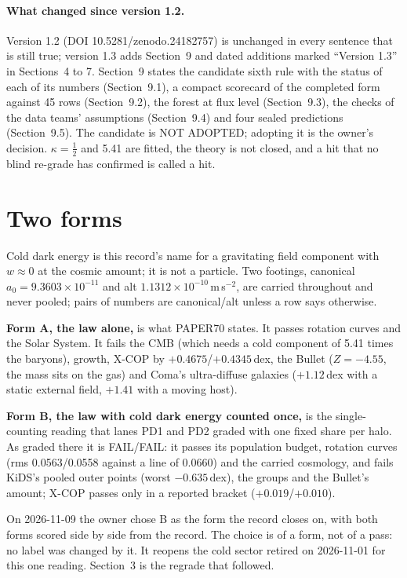 \documentclass[10pt]{article}
\begin{document}
\paragraph{What changed since version 1.2.} Version 1.2 (DOI 10.5281/zenodo.24182757) is unchanged in every sentence that is still true; version 1.3 adds Section~9 and dated additions marked ``Version 1.3'' in Sections~4 to 7. Section~9 states the candidate sixth rule with the status of each of its numbers (Section~9.1), a compact scorecard of the completed form against 45 rows (Section~9.2), the forest at flux level (Section~9.3), the checks of the data teams' assumptions (Section~9.4) and four sealed predictions (Section~9.5). The candidate is NOT ADOPTED; adopting it is the owner's decision. $\kappa=\tfrac12$ and 5.41 are fitted, the theory is not closed, and a hit that no blind re-grade has confirmed is called a hit.

\section{Two forms}
Cold dark energy is this record's name for a gravitating field component with $w\approx0$ at the cosmic amount; it is not a particle. Two footings, canonical $a_0=9.3603\times10^{-11}$ and alt $1.1312\times10^{-10}$\,m\,s$^{-2}$, are carried throughout and never pooled; pairs of numbers are canonical/alt unless a row says otherwise.

\textbf{Form A, the law alone,} is what PAPER70 states. It passes rotation curves and the Solar System. It fails the CMB (which needs a cold component of 5.41 times the baryons), growth, X-COP by $+0.4675$/$+0.4345$\,dex, the Bullet ($Z=-4.55$, the mass sits on the gas) and Coma's ultra-diffuse galaxies ($+1.12$\,dex with a static external field, $+1.41$ with a moving host).

\textbf{Form B, the law with cold dark energy counted once,} is the single-counting reading that lanes PD1 and PD2 graded with one fixed share per halo. As graded there it is FAIL/FAIL: it passes its population budget, rotation curves (rms 0.0563/0.0558 against a line of 0.0660) and the carried cosmology, and fails KiDS's pooled outer points (worst $-0.635$\,dex), the groups and the Bullet's amount; X-COP passes only in a reported bracket ($+0.019$/$+0.010$).

On 2026-11-09 the owner chose B as the form the record closes on, with both forms scored side by side from the record. The choice is of a form, not of a pass: no label was changed by it. It reopens the cold sector retired on 2026-11-01 for this one reading. Section~3 is the regrade that followed.
\end{document}
